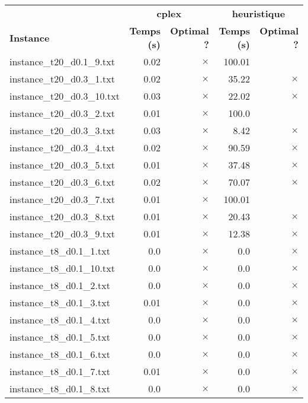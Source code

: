 \documentclass{article}
\begin{document}
\newpage
\begin{center}
\renewcommand{\arraystretch}{1.4} 
 \begin{tabular}{lrrrr}
	\hline
 & \multicolumn{2}{c}{\textbf{cplex}} & \multicolumn{2}{c}{\textbf{heuristique}}\\
\textbf{Instance}  & \textbf{Temps (s)} & \textbf{Optimal ?}  & \textbf{Temps (s)} & \textbf{Optimal ?} \\\hline

instance\_t20\_d0.1\_9.txt & 0.02 & 
$\times$
 & 100.01 & 
\\
instance\_t20\_d0.3\_1.txt & 0.02 & 
$\times$
 & 35.22 & 
$\times$
\\
instance\_t20\_d0.3\_10.txt & 0.03 & 
$\times$
 & 22.02 & 
$\times$
\\
instance\_t20\_d0.3\_2.txt & 0.01 & 
$\times$
 & 100.0 & 
\\
instance\_t20\_d0.3\_3.txt & 0.03 & 
$\times$
 & 8.42 & 
$\times$
\\
instance\_t20\_d0.3\_4.txt & 0.02 & 
$\times$
 & 90.59 & 
$\times$
\\
instance\_t20\_d0.3\_5.txt & 0.01 & 
$\times$
 & 37.48 & 
$\times$
\\
instance\_t20\_d0.3\_6.txt & 0.02 & 
$\times$
 & 70.07 & 
$\times$
\\
instance\_t20\_d0.3\_7.txt & 0.01 & 
$\times$
 & 100.01 & 
\\
instance\_t20\_d0.3\_8.txt & 0.01 & 
$\times$
 & 20.43 & 
$\times$
\\
instance\_t20\_d0.3\_9.txt & 0.01 & 
$\times$
 & 12.38 & 
$\times$
\\
instance\_t8\_d0.1\_1.txt & 0.0 & 
$\times$
 & 0.0 & 
$\times$
\\
instance\_t8\_d0.1\_10.txt & 0.0 & 
$\times$
 & 0.0 & 
$\times$
\\
instance\_t8\_d0.1\_2.txt & 0.0 & 
$\times$
 & 0.0 & 
$\times$
\\
instance\_t8\_d0.1\_3.txt & 0.01 & 
$\times$
 & 0.0 & 
$\times$
\\
instance\_t8\_d0.1\_4.txt & 0.0 & 
$\times$
 & 0.0 & 
$\times$
\\
instance\_t8\_d0.1\_5.txt & 0.0 & 
$\times$
 & 0.0 & 
$\times$
\\
instance\_t8\_d0.1\_6.txt & 0.0 & 
$\times$
 & 0.0 & 
$\times$
\\
instance\_t8\_d0.1\_7.txt & 0.01 & 
$\times$
 & 0.0 & 
$\times$
\\
instance\_t8\_d0.1\_8.txt & 0.0 & 
$\times$
 & 0.0 & 
$\times$
\\

\end{tabular}
\end{center}
\end{document}
